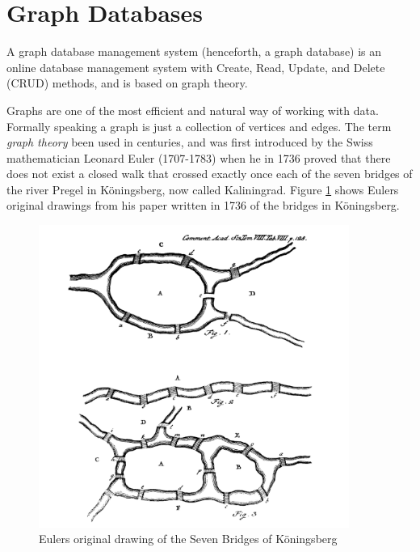 \section{Graph Databases}
A graph database management system \citep{robinson13} (henceforth, a graph database) is an online database management system with Create, Read, Update, and Delete (CRUD) methods, and is based on graph theory.

Graphs are one of the most efficient and natural way of working with data. Formally speaking a graph is just a collection of vertices and edges. The term \textit{graph theory} been used in centuries, and was first introduced by the Swiss mathematician Leonard Euler (1707-1783) when he in 1736 proved that there does not exist a closed walk that crossed exactly once each of the seven bridges of the river Pregel in Köningsberg, now called Kaliningrad\citep{alexanderson06}. Figure \ref{fig:7bridgesEuler} shows Eulers original drawings from his paper written in 1736 \citep{euler1741} of the bridges in Köningsberg. 

\begin{figure}[H]
  \centering
  \includegraphics[width=4in]{assets/7bridges-euler.png}
  \caption{Eulers original drawing of the Seven Bridges of Köningsberg} 
  \label{fig:7bridgesEuler}
\end{figure}

